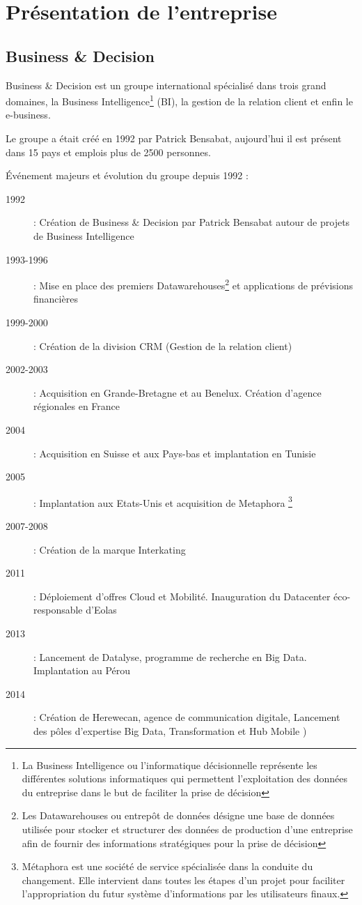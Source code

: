 \chapter{Présentation de l'entreprise}
\section{Business \& Decision}

        Business \& Decision est un groupe international spécialisé dans trois grand domaines, la Business Intelligence\footnote{La Business Intelligence ou l'informatique décisionnelle représente les différentes solutions informatiques qui permettent l'exploitation des données du entreprise dans le but de faciliter la prise de décision} (BI), la gestion de la relation client et enfin le e-business. 

        Le groupe a était créé en 1992 par Patrick Bensabat, aujourd'hui il est présent dans 15 pays et emplois plus de 2500 personnes.

       	  Événement majeurs et évolution du groupe depuis 1992 : 

       	  \begin{description}
       	  \item[1992] : Création de Business \& Decision par Patrick Bensabat autour de projets de Business Intelligence
       	  \item[1993-1996] : Mise en place des premiers Datawarehouses\footnote{Les Datawarehouses ou entrepôt de données désigne une base de données utilisée pour stocker et structurer des données de production d'une entreprise afin de fournir des informations stratégiques pour la prise de décision} et applications de prévisions financières
       	  \item[1999-2000] : Création de la division CRM (Gestion de la relation client)
       	  \item[2002-2003] : Acquisition en Grande-Bretagne et au Benelux. Création d'agence régionales en France
       	  \item[2004] : Acquisition en Suisse et aux Pays-bas et implantation en Tunisie
       	  \item[2005] : Implantation aux Etats-Unis et acquisition de Metaphora \footnote{Métaphora est une société de service spécialisée dans la conduite du changement. Elle intervient dans toutes les étapes d’un projet pour faciliter l’appropriation du futur système d’informations par les utilisateurs finaux.}
       	  \item[2007-2008] : Création de la marque Interkating
       	  \item[2011] : Déploiement d'offres Cloud et Mobilité. Inauguration du Datacenter éco-responsable d'Eolas
       	  \item[2013] : Lancement de Datalyse, programme de recherche en Big Data. Implantation au Pérou
       	  \item[2014] : Création de Herewecan, agence de communication digitale, Lancement des pôles d'expertise Big Data, Transformation et Hub Mobile )
       	  \end{description}
       	  
